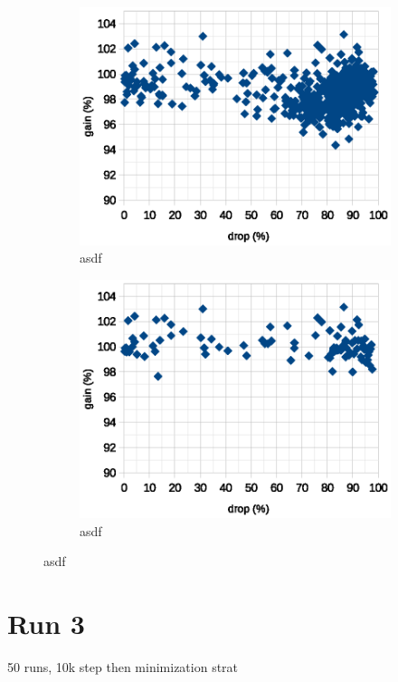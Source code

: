 \documentclass[12pt]{report}
\begin{document}
\begin{center}
\begin{figure}[h!]
\begin{subfigure}[b]{0.49\linewidth}
			\includegraphics[scale=0.7]{dia/all_second.eps}
			\caption{asdf}
		\end{subfigure}
		\begin{subfigure}[b]{0.49\linewidth}
			\centering
			\includegraphics[scale=0.7]{dia/best_second.eps}
			\caption{asdf}
		\end{subfigure}
	\end{figure}
\end{center}

\section{Run 3}
50 runs, 10k step then minimization strat
\end{document}
